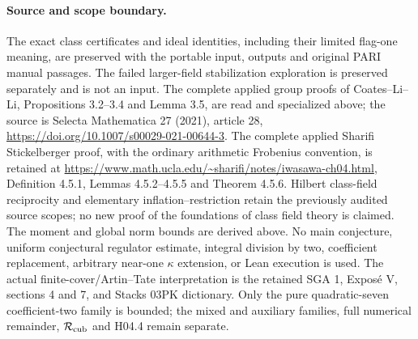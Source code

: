 \paragraph{Source and scope boundary.}
The exact class certificates and ideal identities, including their
limited flag-one meaning, are preserved with the portable input,
outputs and original PARI manual passages.  The failed larger-field
stabilization exploration is preserved separately and is not an input.
The complete applied group proofs of Coates--Li--Li,
Propositions 3.2--3.4 and Lemma 3.5, are read and specialized
above; the source is Selecta Mathematica 27 (2021), article 28,
\url{https://doi.org/10.1007/s00029-021-00644-3}.
The complete applied Sharifi Stickelberger proof, with the
ordinary arithmetic Frobenius convention, is retained at
\url{https://www.math.ucla.edu/~sharifi/notes/iwasawa-ch04.html},
Definition 4.5.1, Lemmas 4.5.2--4.5.5 and Theorem 4.5.6.
Hilbert class-field reciprocity and elementary inflation--restriction
retain the previously audited source scopes; no new proof of the
foundations of class field theory is claimed.
The moment and global norm bounds are derived above.
No main conjecture, uniform conjectural regulator estimate,
integral division by two, coefficient replacement, arbitrary
near-one $\kappa$ extension, or Lean execution is used.
The actual finite-cover/Artin--Tate interpretation is the retained
SGA 1, Expos\'e V, sections 4 and 7, and Stacks 03PK dictionary.
Only the pure quadratic-seven coefficient-two family is bounded;
the mixed and auxiliary families, full numerical remainder,
$\mathcal R_{\rm cub}$ and H04.4 remain separate.
